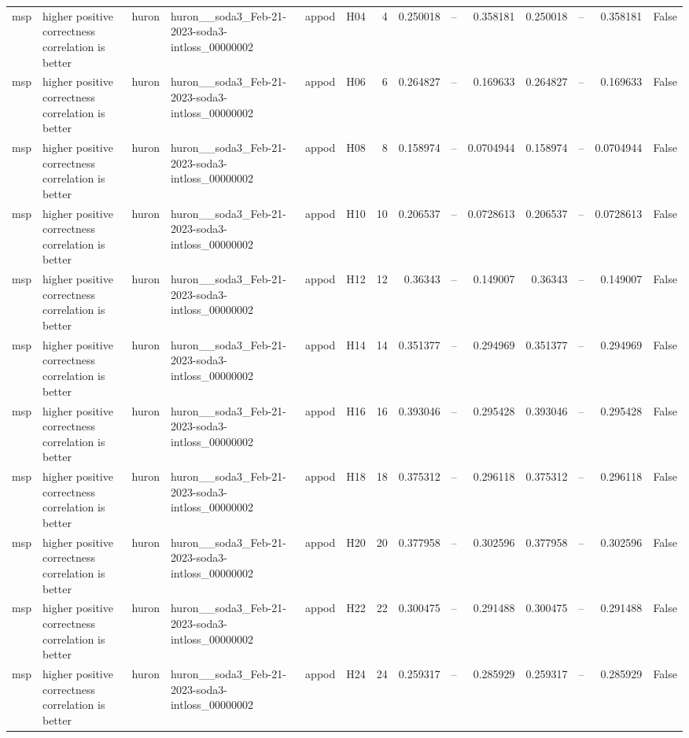 \begin{longtable}{llllllrrrrrrrr}
msp & higher positive correctness correlation is better & huron & huron\_\_soda3\_Feb-21-2023-soda3-intloss\_00000002 & appod & H04 & 4 & 0.250018 & -- & 0.358181 & 0.250018 & -- & 0.358181 & False \\
msp & higher positive correctness correlation is better & huron & huron\_\_soda3\_Feb-21-2023-soda3-intloss\_00000002 & appod & H06 & 6 & 0.264827 & -- & 0.169633 & 0.264827 & -- & 0.169633 & False \\
msp & higher positive correctness correlation is better & huron & huron\_\_soda3\_Feb-21-2023-soda3-intloss\_00000002 & appod & H08 & 8 & 0.158974 & -- & 0.0704944 & 0.158974 & -- & 0.0704944 & False \\
msp & higher positive correctness correlation is better & huron & huron\_\_soda3\_Feb-21-2023-soda3-intloss\_00000002 & appod & H10 & 10 & 0.206537 & -- & 0.0728613 & 0.206537 & -- & 0.0728613 & False \\
msp & higher positive correctness correlation is better & huron & huron\_\_soda3\_Feb-21-2023-soda3-intloss\_00000002 & appod & H12 & 12 & 0.36343 & -- & 0.149007 & 0.36343 & -- & 0.149007 & False \\
msp & higher positive correctness correlation is better & huron & huron\_\_soda3\_Feb-21-2023-soda3-intloss\_00000002 & appod & H14 & 14 & 0.351377 & -- & 0.294969 & 0.351377 & -- & 0.294969 & False \\
msp & higher positive correctness correlation is better & huron & huron\_\_soda3\_Feb-21-2023-soda3-intloss\_00000002 & appod & H16 & 16 & 0.393046 & -- & 0.295428 & 0.393046 & -- & 0.295428 & False \\
msp & higher positive correctness correlation is better & huron & huron\_\_soda3\_Feb-21-2023-soda3-intloss\_00000002 & appod & H18 & 18 & 0.375312 & -- & 0.296118 & 0.375312 & -- & 0.296118 & False \\
msp & higher positive correctness correlation is better & huron & huron\_\_soda3\_Feb-21-2023-soda3-intloss\_00000002 & appod & H20 & 20 & 0.377958 & -- & 0.302596 & 0.377958 & -- & 0.302596 & False \\
msp & higher positive correctness correlation is better & huron & huron\_\_soda3\_Feb-21-2023-soda3-intloss\_00000002 & appod & H22 & 22 & 0.300475 & -- & 0.291488 & 0.300475 & -- & 0.291488 & False \\
msp & higher positive correctness correlation is better & huron & huron\_\_soda3\_Feb-21-2023-soda3-intloss\_00000002 & appod & H24 & 24 & 0.259317 & -- & 0.285929 & 0.259317 & -- & 0.285929 & False \\

\end{longtable}
